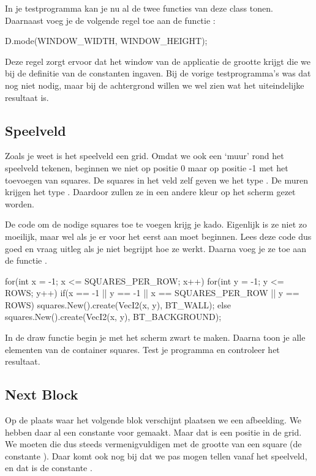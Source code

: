 In je testprogramma kan je nu al de twee functies van deze class tonen. Daarnaast voeg je de volgende regel toe aan de functie :

\begin{code}
D.mode(WINDOW_WIDTH, WINDOW_HEIGHT);
\end{code}

Deze regel zorgt ervoor dat het window van de applicatie de grootte krijgt die we bij de definitie van de constanten ingaven. Bij de vorige testprogramma's was dat nog niet nodig, maar bij de achtergrond willen we wel zien wat het uiteindelijke resultaat is.

\subsection{Speelveld}

Zoals je weet is het speelveld een grid. Omdat we ook een `muur' rond het speelveld tekenen, beginnen we niet op positie 0 maar op positie -1 met het toevoegen van squares. De squares in het veld zelf geven we het type . De muren krijgen het type . Daardoor zullen ze in een andere kleur op het scherm gezet worden.

De code om de nodige squares toe te voegen krijg je kado. Eigenlijk is ze niet zo moeilijk, maar wel als je er voor het eerst aan moet beginnen. Lees deze code dus goed en vraag uitleg als je niet begrijpt hoe ze werkt. Daarna voeg je ze toe aan de functie .

\begin{code}
for(int x = -1; x <= SQUARES_PER_ROW; x++)
{
	 for(int y = -1; y <= ROWS; y++)
	 {
			if(x == -1 || y == -1 || x == SQUARES_PER_ROW || y == ROWS)
			{
				 squares.New().create(VecI2(x, y), BT_WALL);
			} else
			{
				 squares.New().create(VecI2(x, y), BT_BACKGROUND);
			}
	 }
}
\end{code}

In de draw functie begin je met het scherm zwart te maken. Daarna toon je alle elementen van de container squares. Test je programma en controleer het resultaat.

\subsection{Next Block}
Op de plaats waar het volgende blok verschijnt plaatsen we een afbeelding. We hebben daar al een constante  voor gemaakt. Maar dat is een positie in de grid. We moeten die dus steeds vermenigvuldigen met de grootte van een square (de constante ). Daar komt ook nog bij dat we pas mogen tellen vanaf het speelveld, en dat is de constante .

